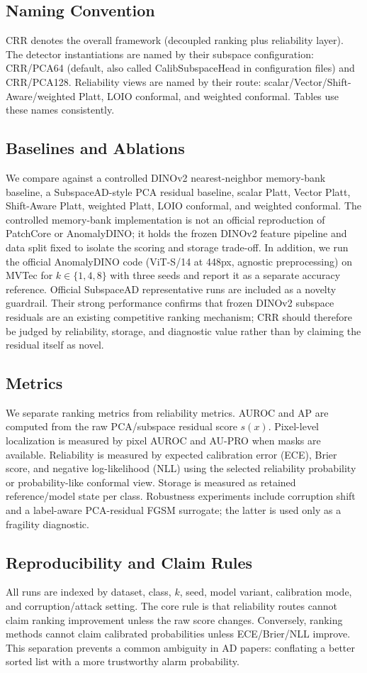 \subsection{Naming Convention}
CRR denotes the overall framework (decoupled ranking plus reliability layer). The detector instantiations are named by their subspace configuration: CRR/PCA64 (default, also called CalibSubspaceHead in configuration files) and CRR/PCA128. Reliability views are named by their route: scalar/Vector/Shift-Aware/weighted Platt, LOIO conformal, and weighted conformal. Tables use these names consistently.

\subsection{Baselines and Ablations}
We compare against a controlled DINOv2 nearest-neighbor memory-bank baseline, a SubspaceAD-style PCA residual baseline, scalar Platt, Vector Platt, Shift-Aware Platt, weighted Platt, LOIO conformal, and weighted conformal. The controlled memory-bank implementation is not an official reproduction of PatchCore or AnomalyDINO; it holds the frozen DINOv2 feature pipeline and data split fixed to isolate the scoring and storage trade-off. In addition, we run the official AnomalyDINO code (ViT-S/14 at 448px, agnostic preprocessing) on MVTec for $k\in\{1,4,8\}$ with three seeds and report it as a separate accuracy reference. Official SubspaceAD representative runs are included as a novelty guardrail. Their strong performance confirms that frozen DINOv2 subspace residuals are an existing competitive ranking mechanism; CRR should therefore be judged by reliability, storage, and diagnostic value rather than by claiming the residual itself as novel.

\subsection{Metrics}
We separate ranking metrics from reliability metrics. AUROC and AP are computed from the raw PCA/subspace residual score $s(x)$. Pixel-level localization is measured by pixel AUROC and AU-PRO when masks are available. Reliability is measured by expected calibration error (ECE), Brier score, and negative log-likelihood (NLL) using the selected reliability probability or probability-like conformal view. Storage is measured as retained reference/model state per class. Robustness experiments include corruption shift and a label-aware PCA-residual FGSM surrogate; the latter is used only as a fragility diagnostic.

\subsection{Reproducibility and Claim Rules}
All runs are indexed by dataset, class, $k$, seed, model variant, calibration mode, and corruption/attack setting. The core rule is that reliability routes cannot claim ranking improvement unless the raw score changes. Conversely, ranking methods cannot claim calibrated probabilities unless ECE/Brier/NLL improve. This separation prevents a common ambiguity in AD papers: conflating a better sorted list with a more trustworthy alarm probability.
